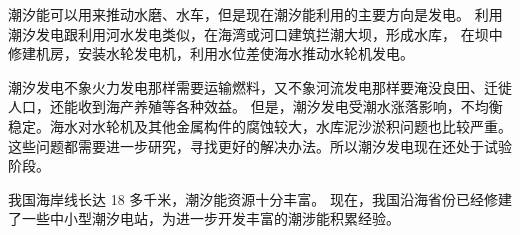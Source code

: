 潮汐能可以用来推动水磨、水车，但是现在潮汐能利用的主要方向是发电。
利用潮汐发电跟利用河水发电类似，在海湾或河口建筑拦潮大坝，形成水库，
在坝中修建机房，安装水轮发电机，利用水位差使海水推动水轮机发电。

潮汐发电不象火力发电那样需要运输燃料，又不象河流发电那样要淹没良田、迁徙人口，还能收到海产养殖等各种效益。
但是，潮汐发电受潮水涨落影响，不均衡稳定。海水对水轮机及其他金属构件的腐蚀较大，水库泥沙淤积问题也比较严重。
这些问题都需要进一步研究，寻找更好的解决办法。所以潮汐发电现在还处于试验阶段。

我国海岸线长达 18 多千米，潮汐能资源十分丰富。
现在，我国沿海省份已经修建了一些中小型潮汐电站，为进一步开发丰富的潮涉能积累经验。


